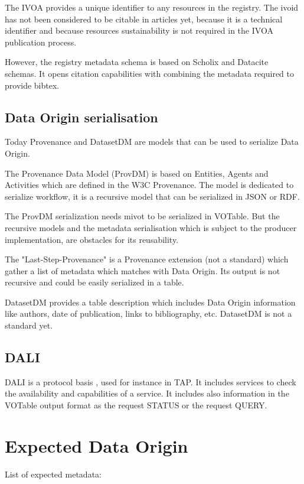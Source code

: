 \documentclass[11pt,a4paper]{ivoa}
\begin{document}
The IVOA provides a unique identifier to any resources in the registry. The ivoid has not been considered to be citable in articles yet, because it is a technical identifier and because resources sustainability is not required in the IVOA publication process.

However, the registry metadata schema is based on Scholix and Datacite schemas. It opens citation capabilities with combining the metadata required to provide bibtex.

\subsection{Data Origin serialisation}
Today Provenance and DatasetDM are models that can be used to serialize Data Origin.

The Provenance Data Model (ProvDM) is based on Entities, Agents and Activities which are defined in the W3C Provenance. The model is dedicated to serialize workflow,
it is a recursive model that can be serialized in JSON or RDF. 

The ProvDM serialization needs mivot to be serialized in VOTable. But the recursive models and the metadata serialisation which is subject to the producer implementation, are obstacles for its reusability.


The "Last-Step-Provenance" is a Provenance extension (not a standard) which gather a list of metadata which matches with Data Origin. Its output is not recursive and could be easily serialized in a table.


DatasetDM provides a table description which includes Data Origin information like authors, date of publication, links to bibliography, etc.
DatasetDM is not a standard yet.

\subsection{DALI}
DALI is a protocol basis , used for instance in TAP. It includes services to  check the availability and capabilities of a service. It includes also information in the VOTable output format as the request STATUS or the request QUERY.


\section{Expected Data Origin}

List of expected metadata:
\end{document}

